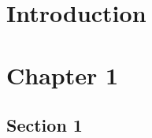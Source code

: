 \documentclass[11pt, a4paper]{report}
\begin{document}
\setlength{\parskip}{0.0cm}
\tableofcontents
\setlength{\parskip}{0.4cm}

\chapter{Introduction}

\chapter{Chapter 1}

\section{Section 1}


%
\end{document}
